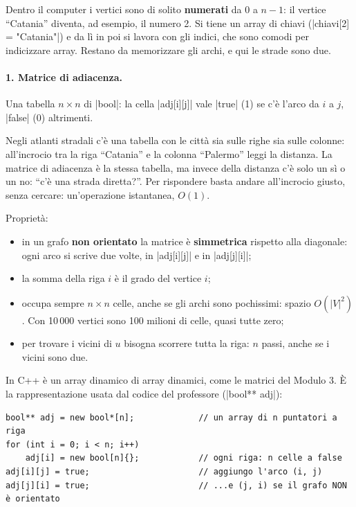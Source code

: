 Dentro il computer i vertici sono di solito \textbf{numerati} da $0$ a $n - 1$: il
vertice ``Catania'' diventa, ad esempio, il numero 2. Si tiene un array di chiavi
(\cc|chiavi[2] = "Catania"|) e da lì in poi si lavora con gli indici, che sono comodi
per indicizzare array. Restano da memorizzare gli archi, e qui le strade sono due.

\paragraph{1. Matrice di adiacenza.}
Una tabella $n \times n$ di \cc|bool|: la cella \cc|adj[i][j]| vale \cc|true| (1) se c'è
l'arco da $i$ a $j$, \cc|false| (0) altrimenti.

\begin{analogia}
Negli atlanti stradali c'è una tabella con le città sia sulle righe sia sulle colonne:
all'incrocio tra la riga ``Catania'' e la colonna ``Palermo'' leggi la distanza. La
matrice di adiacenza è la stessa tabella, ma invece della distanza c'è solo un sì o un
no: ``c'è una strada diretta?''. Per rispondere basta andare all'incrocio giusto, senza
cercare: un'operazione istantanea, $O(1)$.
\end{analogia}

Proprietà:
\begin{itemize}
  \item in un grafo \textbf{non orientato} la matrice è \textbf{simmetrica} rispetto alla
        diagonale: ogni arco si scrive due volte, in \cc|adj[i][j]| e in \cc|adj[j][i]|;
  \item la somma della riga $i$ è il grado del vertice $i$;
  \item occupa sempre $n \times n$ celle, anche se gli archi sono pochissimi: spazio
        $O(|V|^2)$. Con 10\,000 vertici sono 100 milioni di celle, quasi tutte zero;
  \item per trovare i vicini di $u$ bisogna scorrere tutta la riga: $n$ passi, anche se
        i vicini sono due.
\end{itemize}

In C++ è un array dinamico di array dinamici, come le matrici del Modulo 3. È la
rappresentazione usata dal codice del professore (\cc|bool** adj|):
\begin{lstlisting}
bool** adj = new bool*[n];             // un array di n puntatori a riga
for (int i = 0; i < n; i++)
    adj[i] = new bool[n]{};            // ogni riga: n celle a false
adj[i][j] = true;                      // aggiungo l'arco (i, j)
adj[j][i] = true;                      // ...e (j, i) se il grafo NON è orientato
\end{lstlisting}

